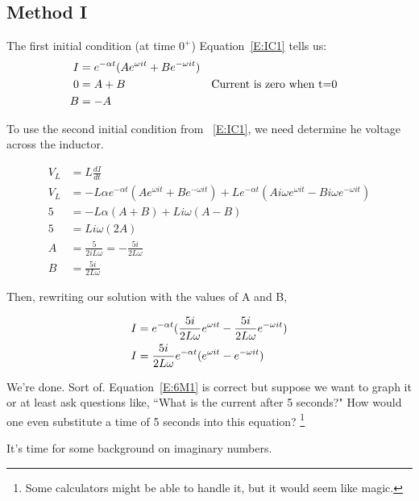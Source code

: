 \subsection{Method I}
The first initial condition (at time $0^+$) Equation~\eqref{E:IC1} tells us:
\begin{align}
I&=e^{-\alpha t}(Ae^{\omega it}+Be^{-\omega it}) \label{E:6RLC}\\
0&=A+B&&\text{Current is zero when t=0} \notag\\
B&=-A \notag
\end{align}

To use the second initial condition from ~\eqref{E:IC1}, we need determine he voltage across the inductor.\par

\begin{align*}
V_L &= L\frac{dI}{dt}\\
V_L&=-L\alpha e^{-\alpha t}(Ae^{\omega it}+Be^{-\omega it})+
	Le^{-\alpha t}(Ai\omega e^{\omega it}-Bi\omega e^{-\omega it})\\
5&=-L\alpha(A+B)+Li\omega(A-B)\\
5&=Li\omega(2A)\\
A&=\frac{5}{2iL\omega}=-\frac{5i}{2L\omega}\\
B&=\frac{5i}{2L\omega}
\end{align*}

Then, rewriting our solution with the values of A and B,

\begin{align}
I&=e^{-\alpha t}(\frac{5i}{2L\omega}e^{\omega it}-\frac{5i}{2L\omega}e^{-\omega it}) \notag\\
I&=\frac{5i}{2L\omega}e^{-\alpha t}(e^{\omega it}-e^{-\omega it}) \label{E:6M1}
\end{align} 

We're done. Sort of. Equation~\eqref{E:6M1} is correct but suppose we want to graph it or at least ask questions like, ``What is the current after 5 seconds?" How would one even substitute a time of 5 seconds into this equation? \footnote{Some calculators might be able to handle it, but it would seem like magic.}\par
It's time for some background on imaginary numbers.

